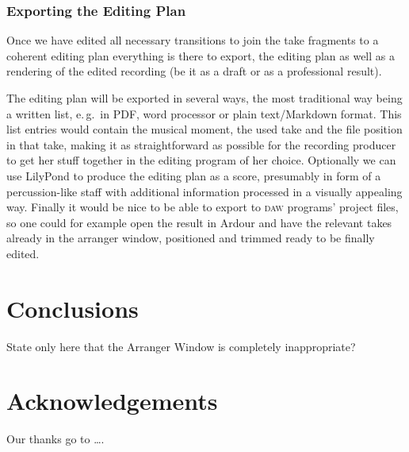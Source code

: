 \documentclass[11pt,a4paper]{article}
\begin{document}
\subsubsection{Exporting the Editing Plan}

Once we have edited all necessary transitions to join the take fragments to a coherent editing plan everything is there to export, the editing plan as well as a rendering of the edited recording (be it as a draft or as a professional result).

The editing plan will be exported in several ways, the most traditional way being a written list, e.\,g.\ in PDF, word processor or plain text/Markdown format.
This list entries would contain the musical moment, the used take and the file position in that take, making it as straightforward as possible for the recording producer to get her stuff together in the editing program of her choice.
Optionally we can use LilyPond to produce the editing plan as a score, presumably in form of a percussion-like staff with additional information processed in a visually appealing way.
Finally it would be nice to be able to export to \textsc{daw} programs' project files, so one could for example open the result in Ardour and have the relevant takes already in the arranger window, positioned and trimmed ready to be finally edited.


\section{Conclusions}

State only here that the Arranger Window is completely inappropriate?


\section{Acknowledgements}

Our thanks go to \ldots .
\end{document}
